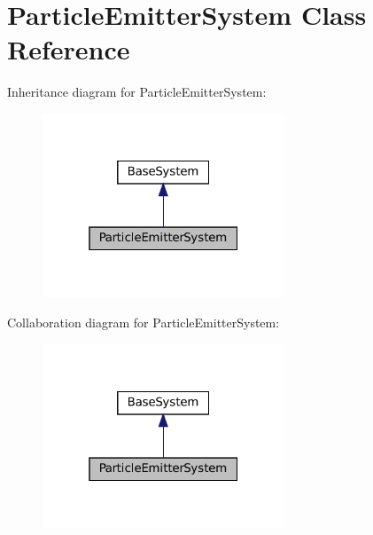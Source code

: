 \hypertarget{classParticleEmitterSystem}{}\section{Particle\+Emitter\+System Class Reference}
\label{classParticleEmitterSystem}


Inheritance diagram for Particle\+Emitter\+System\+:
\nopagebreak
\begin{figure}[H]
\begin{center}
\leavevmode
\includegraphics[width=205pt]{classParticleEmitterSystem__inherit__graph}
\end{center}
\end{figure}


Collaboration diagram for Particle\+Emitter\+System\+:
\nopagebreak
\begin{figure}[H]
\begin{center}
\leavevmode
\includegraphics[width=205pt]{classParticleEmitterSystem__coll__graph}
\end{center}
\end{figure}
